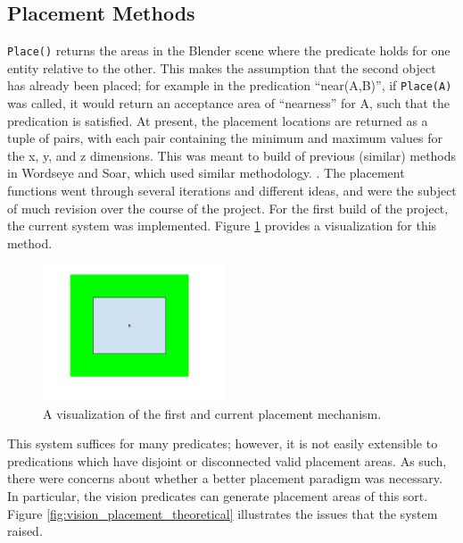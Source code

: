 \subsection{Placement Methods}

\texttt{Place()} returns the areas in the Blender scene where the predicate holds for one entity relative to the other. This makes the assumption that the second object has already been placed; for example in the predication ``near(A,B)'', if \texttt{Place(A)} was called, it would return an acceptance area of ``nearness'' for A, such that the predication is satisfied. 
At present, the placement locations are returned as a tuple of pairs, with each pair containing the minimum and maximum values for the x, y, and z dimensions. This was meant to build of previous (similar) methods in Wordseye and Soar, which used similar methodology. \cite{wordseye,wintermute2009overview}.
The placement functions went through several iterations and different ideas, and were the subject of much revision over the course of the project.
For the first build of the project, the current system was implemented. Figure \ref{fig:square_placement} provides a visualization for this method.
 
\begin{figure}[h]
	\begin{center}
		\includegraphics[width=0.48\textwidth]{figures/square_placement.png}
	\vspace{-1cm}
	\caption{A visualization of the first and current placement mechanism.}
	\label{fig:square_placement}
	\end{center}
\end{figure}

This system suffices for many predicates; however, it is not easily extensible to predications which have disjoint or disconnected valid placement areas. 
As such, there were concerns about whether a better placement paradigm was necessary.
In particular, the vision predicates can generate placement areas of this sort. Figure \ref{fig:vision_placement_theoretical} illustrates the issues that the system raised.

